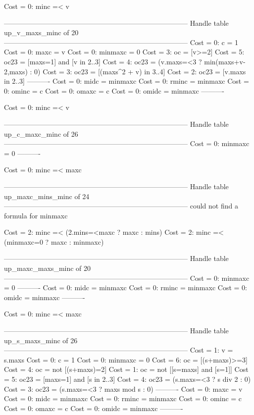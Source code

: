 Cost =  0:  minc =< v

--------------------------------------------------------------------------------
Handle table up_v_maxs_minc of 20
--------------------------------------------------------------------------------
Cost =  0:  c       = 1
Cost =  0:  maxc    = v
Cost =  0:  minmaxc = 0
Cost =  3:  oc      = [v>=2]
Cost =  5:  oc23    = [maxs=1] and [v in 2..3]
Cost =  4:  oc23    = (v.maxs=<3 ? min(maxs+v-2,maxs) : 0)
Cost =  3:  oc23    = [(maxs^2 + v) in 3..4]
Cost =  2:  oc23    = [v.maxs in 2..3]
----------
Cost =  0:  midc    = minmaxc
Cost =  0:  rminc   = minmaxc
Cost =  0:  ominc   = c
Cost =  0:  omaxc   = c
Cost =  0:  omidc   = minmaxc
----------

Cost =  0:  minc =< v

--------------------------------------------------------------------------------
Handle table up_c_maxc_minc of 26
--------------------------------------------------------------------------------
Cost =  0:  minmaxc = 0
----------

Cost =  0:  minc =< maxc

--------------------------------------------------------------------------------
Handle table up_maxc_mins_minc of 24
--------------------------------------------------------------------------------
could not find a formula for minmaxc

Cost =  2:  minc =< (2.mins=<maxc ? maxc : mins)
Cost =  2:  minc =< (minmaxc=0 ? maxc : minmaxc)

--------------------------------------------------------------------------------
Handle table up_maxc_maxs_minc of 20
--------------------------------------------------------------------------------
Cost =  0:  minmaxc = 0
----------
Cost =  0:  midc    = minmaxc
Cost =  0:  rminc   = minmaxc
Cost =  0:  omidc   = minmaxc
----------

Cost =  0:  minc =< maxc

--------------------------------------------------------------------------------
Handle table up_s_maxs_minc of 26
--------------------------------------------------------------------------------
Cost =  1:  v       = s.maxs
Cost =  0:  c       = 1
Cost =  0:  minmaxc = 0
Cost =  6:  oc      = [(s+maxs)>=3]
Cost =  4:  oc      = not [(s+maxs)=2]
Cost =  1:  oc      = not [[s=maxs] and [s=1]]
Cost =  5:  oc23    = [maxs=1] and [s in 2..3]
Cost =  4:  oc23    = (s.maxs=<3 ? s div 2 : 0)
Cost =  3:  oc23    = (s.maxs=<3 ? maxs mod s : 0)
----------
Cost =  0:  maxc    = v
Cost =  0:  midc    = minmaxc
Cost =  0:  rminc   = minmaxc
Cost =  0:  ominc   = c
Cost =  0:  omaxc   = c
Cost =  0:  omidc   = minmaxc
----------

